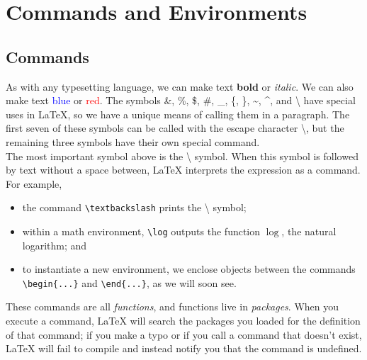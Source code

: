 \documentclass[12pt]{article}	%
\begin{document}

\newpage
\section{Commands and Environments}

\subsection{Commands}

As with any typesetting language, we can make text {\bf bold} or {\it italic}. We can also make text \textcolor{blue}{blue} or \textcolor{red}{red}. The symbols \&, \%, \$, \#, \_, \{, \}, \textasciitilde, \textasciicircum, and \textbackslash{} have special uses in \LaTeX{}, so we have a unique means of calling them in a paragraph. The first seven of these symbols can be called with the escape character \textbackslash, but the remaining three symbols have their own special command. \\

The most important symbol above is the \textbackslash{} symbol. When this symbol is followed by text without a space between, \LaTeX{} interprets the expression as a command. For example,
	\begin{itemize}
		\item the command \verb!\textbackslash! prints the \textbackslash{} symbol;
		\item within a math environment, \verb!\log! outputs the function $\log$, the natural logarithm; and
		\item to instantiate a new environment, we enclose objects between the commands \verb!\begin{...}! and \verb!\end{...}!, as we will soon see.
	\end{itemize}
These commands are all {\it functions}, and functions live in {\it packages}. When you execute a command, \LaTeX{} will search the packages you loaded for the definition of that command; if you make a typo or if you call a command that doesn't exist, \LaTeX{} will fail to compile and instead notify you that the command is undefined. \\
\end{document}
